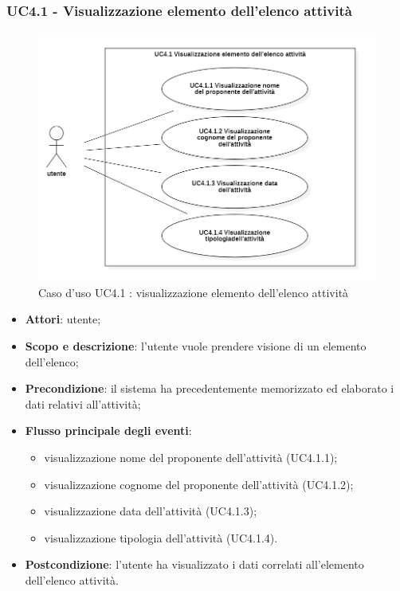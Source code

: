 \subsubsection{UC4.1 - Visualizzazione elemento dell'elenco attività}
\begin{figure}[H]
	\centering
	\includegraphics[width=0.8\linewidth]{res/images/UC4.1.png}
	\caption{Caso d'uso UC4.1 : visualizzazione elemento dell'elenco attività}
\end{figure}
\begin{itemize}
\item \textbf{Attori}: utente;
\item \textbf{Scopo e descrizione}: l’utente vuole prendere visione di un elemento dell'elenco;
\item \textbf{Precondizione}: il sistema ha precedentemente memorizzato ed elaborato i dati relativi all'attività;
\item \textbf{Flusso principale degli eventi}:
\begin{itemize}
    \item visualizzazione nome del proponente dell’attività (UC4.1.1);
    \item visualizzazione cognome del proponente dell’attività (UC4.1.2);
    \item visualizzazione data dell’attività (UC4.1.3);
    \item visualizzazione tipologia dell’attività (UC4.1.4).
\end{itemize}
\item \textbf{Postcondizione}: l’utente ha visualizzato i dati correlati all’elemento dell'elenco attività.
\end{itemize}

